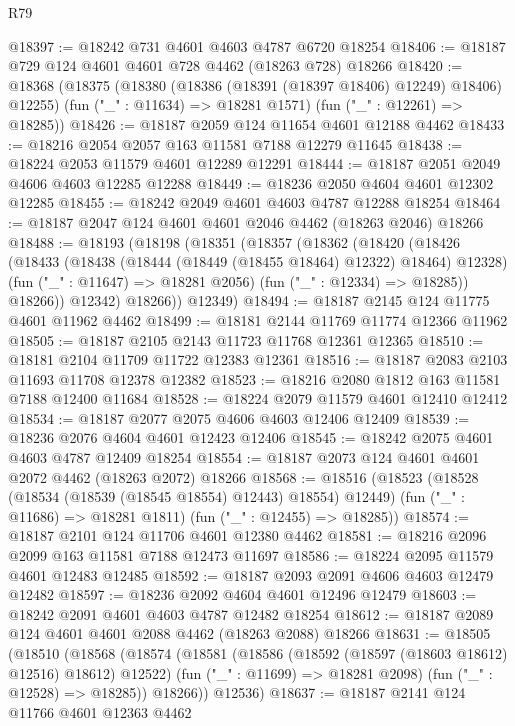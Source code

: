 \begin{lexlean}{R79}
\begin{coremodule}
@18397 := @18242 @731 @4601 @4603 @4787 @6720 @18254
@18406 := @18187 @729 @124 @4601 @4601 @728 @4462 (@18263 @728) @18266
@18420 := @18368
    (@18375
      (@18380 (@18386 (@18391 (@18397 @18406) @12249) @18406) @12255)
      (fun ("_" : @11634) => @18281 @1571)
      (fun ("_" : @12261) => @18285))
@18426 := @18187 @2059 @124 @11654 @4601 @12188 @4462
@18433 := @18216 @2054 @2057 @163 @11581 @7188 @12279 @11645
@18438 := @18224 @2053 @11579 @4601 @12289 @12291
@18444 := @18187 @2051 @2049 @4606 @4603 @12285 @12288
@18449 := @18236 @2050 @4604 @4601 @12302 @12285
@18455 := @18242 @2049 @4601 @4603 @4787 @12288 @18254
@18464 := @18187 @2047 @124 @4601 @4601 @2046 @4462 (@18263 @2046) @18266
@18488 := @18193
    (@18198
      (@18351
        (@18357
          (@18362
            (@18420
              (@18426
                (@18433
                  (@18438 (@18444 (@18449 (@18455 @18464) @12322) @18464) @12328)
                  (fun ("_" : @11647) => @18281 @2056)
                  (fun ("_" : @12334) => @18285))
                @18266))
            @12342)
          @18266))
      @12349)
@18494 := @18187 @2145 @124 @11775 @4601 @11962 @4462
@18499 := @18181 @2144 @11769 @11774 @12366 @11962
@18505 := @18187 @2105 @2143 @11723 @11768 @12361 @12365
@18510 := @18181 @2104 @11709 @11722 @12383 @12361
@18516 := @18187 @2083 @2103 @11693 @11708 @12378 @12382
@18523 := @18216 @2080 @1812 @163 @11581 @7188 @12400 @11684
@18528 := @18224 @2079 @11579 @4601 @12410 @12412
@18534 := @18187 @2077 @2075 @4606 @4603 @12406 @12409
@18539 := @18236 @2076 @4604 @4601 @12423 @12406
@18545 := @18242 @2075 @4601 @4603 @4787 @12409 @18254
@18554 := @18187 @2073 @124 @4601 @4601 @2072 @4462 (@18263 @2072) @18266
@18568 := @18516
    (@18523
      (@18528 (@18534 (@18539 (@18545 @18554) @12443) @18554) @12449)
      (fun ("_" : @11686) => @18281 @1811)
      (fun ("_" : @12455) => @18285))
@18574 := @18187 @2101 @124 @11706 @4601 @12380 @4462
@18581 := @18216 @2096 @2099 @163 @11581 @7188 @12473 @11697
@18586 := @18224 @2095 @11579 @4601 @12483 @12485
@18592 := @18187 @2093 @2091 @4606 @4603 @12479 @12482
@18597 := @18236 @2092 @4604 @4601 @12496 @12479
@18603 := @18242 @2091 @4601 @4603 @4787 @12482 @18254
@18612 := @18187 @2089 @124 @4601 @4601 @2088 @4462 (@18263 @2088) @18266
@18631 := @18505
    (@18510
      (@18568
        (@18574
          (@18581
            (@18586 (@18592 (@18597 (@18603 @18612) @12516) @18612) @12522)
            (fun ("_" : @11699) => @18281 @2098)
            (fun ("_" : @12528) => @18285))
          @18266))
      @12536)
@18637 := @18187 @2141 @124 @11766 @4601 @12363 @4462

\end{coremodule}
\end{lexlean}
